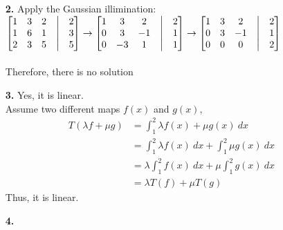 \documentclass{article}
\begin{document}
\begin{itemize}
\begin{itemize}
    \end{itemize}
    \item [\textbf{2.}]
    Apply the Gaussian illimination:\\
\(
\begin{bmatrix}
    1&3&2&\bigm|&2\\
    1&6&1&\bigm|&3\\
    2&3&5&\bigm|&5
\end{bmatrix}
\rightarrow
\begin{bmatrix}
    1&3&2&\bigm|&2\\
    0&3&-1&\bigm|&1\\
    0&-3&1&\bigm|&1
\end{bmatrix}
\rightarrow
\begin{bmatrix}
    1&3&2&\bigm|&2\\
    0&3&-1&\bigm|&1\\
    0&0&0&\bigm|&2
\end{bmatrix}
\)
\\ \\
Therefore, there is no solution\\
    \newpage
    \item [\textbf{3.}]
    Yes, it is linear.\\
    Assume two different maps \(f(x)\) and \(g(x)\),
    \begin{align*}
        T(\lambda f+\mu g)  &=\int^2_1 \lambda f(x)+\mu g(x)\ dx\\
                            &=\int^2_1 \lambda f(x)\ dx+\int^2_1 \mu g(x)\ dx\\
                            &=\lambda \int^2_1 f(x)\ dx+ \mu\int^2_1  g(x)\ dx\\
                            &=\lambda T(f)+\mu T(g)
    \end{align*}
    Thus,  it is linear.\\
    \item [\textbf{4.}]
    \item []
\end{itemize}
\end{document}
